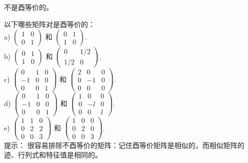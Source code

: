 \begin{problemset}
不是酉等价的。
\item \label{ex:05-06-07} 以下哪些矩阵对是酉等价的：
\\
a) $\begin{pmatrix} 1 & 0 \\ 0 & 1 \end{pmatrix}$ 和 $\begin{pmatrix} 0 & 1 \\ 1 & 0 \end{pmatrix}$.~
\\
b) $\begin{pmatrix} 0 & 1 \\ 1 & 0 \end{pmatrix}$ 和 $\begin{pmatrix} 0 & 1/2 \\ 1/2 & 0 \end{pmatrix}$.~
\\
c) $\begin{pmatrix} 0 & 1 & 0 \\ -1 & 0 & 0 \\ 0 & 0 & 1 \end{pmatrix}$ 和 $\begin{pmatrix} 2 & 0 & 0 \\ 0 & -1 & 0 \\ 0 & 0 & 0 \end{pmatrix}$.~
\\
d) $\begin{pmatrix} 0 & 1 & 0 \\ -1 & 0 & 0 \\ 0 & 0 & 1 \end{pmatrix}$ 和 $\begin{pmatrix} 1 & 0 & 0 \\ 0 & -\ii & 0 \\ 0 & 0 & \ii \end{pmatrix}$.~
\\
e) $\begin{pmatrix} 1 & 1 & 0 \\ 0 & 2 & 2 \\ 0 & 0 & 3 \end{pmatrix}$ 和 $\begin{pmatrix} 1 & 0 & 0 \\ 0 & 2 & 0 \\ 0 & 0 & 3 \end{pmatrix}$.~
\\
{\heiti 提示：} 很容易排除不酉等价的矩阵：记住酉等价矩阵是相似的，而相似矩阵的迹、行列式和特征值是相同的。
\\

\end{problemset}
